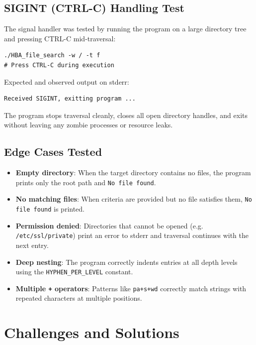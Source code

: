 \documentclass[12pt, a4paper]{article}
\begin{document}
\subsection{SIGINT (CTRL-C) Handling Test}

The signal handler was tested by running the program on a large directory tree and
pressing CTRL-C mid-traversal:

\begin{lstlisting}[style=bashstyle]
./HBA_file_search -w / -t f
# Press CTRL-C during execution
\end{lstlisting}

Expected and observed output on stderr:

\begin{lstlisting}[style=bashstyle]
Received SIGINT, exitting program ...
\end{lstlisting}

The program stops traversal cleanly, closes all open directory handles, and exits
without leaving any zombie processes or resource leaks.

\subsection{Edge Cases Tested}

\begin{itemize}[noitemsep]
    \item \textbf{Empty directory}: When the target directory contains no files, the program
          prints only the root path and \texttt{No file found}.
    \item \textbf{No matching files}: When criteria are provided but no file satisfies them,
          \texttt{No file found} is printed.
    \item \textbf{Permission denied}: Directories that cannot be opened (e.g. \texttt{/etc/ssl/private})
          print an error to stderr and traversal continues with the next entry.
    \item \textbf{Deep nesting}: The program correctly indents entries at all depth levels
          using the \texttt{HYPHEN\_PER\_LEVEL} constant.
    \item \textbf{Multiple \texttt{+} operators}: Patterns like \texttt{pa+s+wd} correctly
          match strings with repeated characters at multiple positions.
\end{itemize}

\section{Challenges and Solutions}
\end{document}
